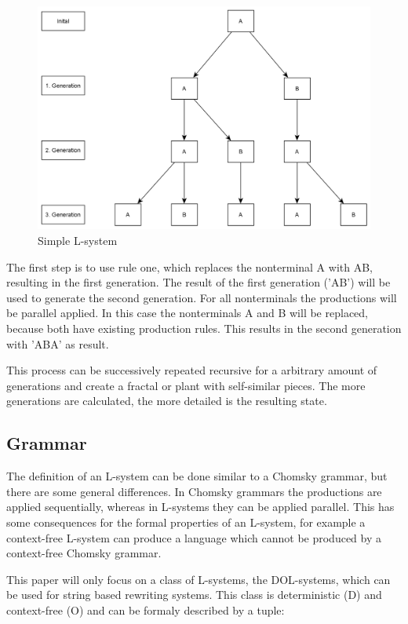 \documentclass[english]{cpp-hmwk}
\begin{document}
\begin{figure}[h!]
	\centering
	\includegraphics[width=0.7\columnwidth]{../graphs/Examples/simple_lsystem.png}
	\caption{Simple L-system}
	\label{figure:simple_lsystem}
\end{figure}

The first step is to use rule one, which replaces the nonterminal A with AB, resulting in the first generation. The result of the first generation ('AB') will be used to generate the second generation. For all nonterminals the productions will be parallel applied. In this case the nonterminals A and B will be replaced, because both have existing production rules. This results in the second generation with 'ABA' as result.

This process can be successively repeated recursive for a arbitrary amount of generations and create a fractal or plant with self-similar pieces. The more generations are calculated, the more detailed is the resulting state. 

\subsection{Grammar}
\label{section:grammar}
The definition of an L-system can be done similar to a Chomsky grammar, but there are some general differences. In Chomsky grammars the productions are applied sequentially, whereas in L-systems they can be applied parallel. This has some consequences for the formal properties of an L-system, for example a context-free L-system can produce a language which cannot be produced by a context-free Chomsky grammar.\cite[Cf. Chapter 1.1, p.~3]{prusinkiewiczp.lindenmayera.2004}

\noindent This paper will only focus on a class of L-systems, the DOL-systems, which can be used for string based rewriting systems. This class is deterministic (D) and context-free (O) and can be formaly described  by a tuple:
\end{document}

